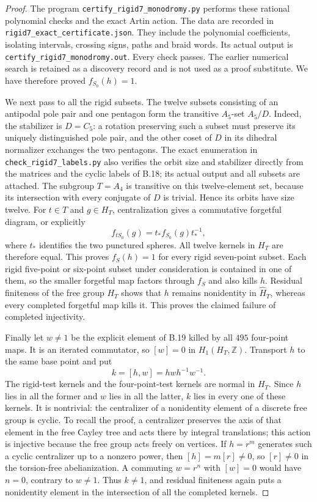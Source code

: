 \begin{proof}
The program \texttt{certify\_rigid7\_monodromy.py} performs
these rational polynomial checks and the exact Artin action.
The data are recorded in
\texttt{rigid7\_exact\_certificate.json}.
They include the polynomial coefficients, isolating intervals,
crossing signs, paths and braid words.
Its actual output is \texttt{certify\_rigid7\_monodromy.out}.
Every check passes.  The earlier numerical search is retained
as a discovery record and is not used as a proof substitute.
We have therefore proved $f_{S_0}(h)=1$.

We next pass to all the rigid subsets.
The twelve subsets consisting of an antipodal pole pair
and one pentagon form the transitive $A_5$-set $A_5/D$.
Indeed, the stabilizer is $D=C_5$: a rotation preserving
such a subset must preserve its uniquely distinguished
pole pair, and the other coset of $D$ in its dihedral
normalizer exchanges the two pentagons.
The exact enumeration in \texttt{check\_rigid7\_labels.py}
also verifies the orbit size and stabilizer directly from
the matrices and the cyclic labels of B.18; its actual output
and all subsets are attached.
The subgroup $T=A_4$ is transitive on this twelve-element
set, because its intersection with every conjugate of $D$
is trivial.  Hence its orbits have size twelve.
For $t\in T$ and $g\in H_T$, centralization gives a
commutative forgetful diagram, or explicitly
\[
 f_{tS_0}(g)=t_*f_{S_0}(g)t_*^{-1},
\]
where $t_*$ identifies the two punctured spheres.
All twelve kernels in $H_T$ are therefore equal.
This proves $f_S(h)=1$ for every rigid seven-point subset.
Each rigid five-point or six-point subset under consideration
is contained in one of them, so the smaller forgetful map
factors through $f_S$ and also kills $h$.
Residual finiteness of the free group $H_T$ shows that
$h$ remains nonidentity in $\widehat H_T$, whereas every
completed forgetful map kills it.  This proves the claimed
failure of completed injectivity.

Finally let $w\ne1$ be the explicit element of B.19 killed
by all $495$ four-point maps.  It is an iterated commutator,
so $[w]=0$ in $H_1(H_T,\mathbb Z)$.
Transport $h$ to the same base point and put
\[
 k=[h,w]=hwh^{-1}w^{-1}.
 \tag{B.56.3}
\]
The rigid-test kernels and the four-point-test kernels are
normal in $H_T$.  Since $h$ lies in all the former and $w$
lies in all the latter, $k$ lies in every one of these kernels.
It is nontrivial: the centralizer of a nonidentity element
of a discrete free group is cyclic.  To recall the proof,
a centralizer preserves the axis of that element in the
free Cayley tree and acts there by integral translations;
this action is injective because the free group acts freely
on vertices.  If $h=r^m$ generates
such a cyclic centralizer up to a nonzero power, then
$[h]=m[r]\ne0$, so $[r]\ne0$ in the torsion-free abelianization.
A commuting $w=r^n$ with $[w]=0$ would have $n=0$, contrary
to $w\ne1$.
Thus $k\ne1$, and residual finiteness again puts a
nonidentity element in the intersection of all the
completed kernels.


\end{proof}
